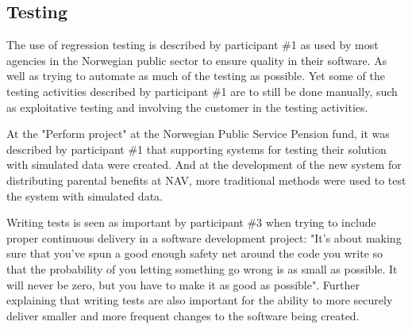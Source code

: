 
\subsection{Testing} \label{sec:testing}
The use of regression testing is described by participant \#1 as used by most agencies in the Norwegian public sector to ensure quality in their software. As well as trying to automate as much of the testing as possible. Yet some of the testing activities described by participant \#1 are to still be done manually, such as exploitative testing and involving the customer in the testing activities.


At the "Perform project" at the Norwegian Public Service Pension fund, it was described by participant \#1 that supporting systems for testing their solution with simulated data were created. And at the development of the new system for distributing parental benefits at NAV, more traditional methods were used to test the system with simulated data.


Writing tests is seen as important by participant \#3 when trying to include proper continuous delivery in a software development project: "It's about making sure that you've spun a good enough safety net around the code you write so that the probability of you letting something go wrong is as small as possible. It will never be zero, but you have to make it as good as possible". Further explaining that writing tests are also important for the ability to more securely deliver smaller and more frequent changes to the software being created.

